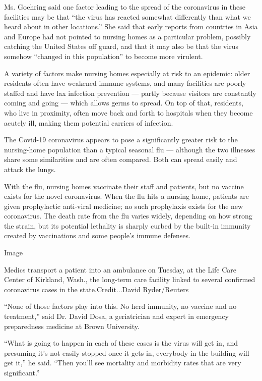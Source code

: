 Ms. Goehring said one factor leading to the spread of the coronavirus in
these facilities may be that ``the virus has reacted somewhat
differently than what we heard about in other locations.'' She said that
early reports from countries in Asia and Europe had not pointed to
nursing homes as a particular problem, possibly catching the United
States off guard, and that it may also be that the virus somehow
``changed in this population'' to become more virulent.

A variety of factors make nursing homes especially at risk to an
epidemic: older residents often have weakened immune systems, and many
facilities are poorly staffed and have lax infection prevention ---
partly because visitors are constantly coming and going --- which allows
germs to spread. On top of that, residents, who live in proximity, often
move back and forth to hospitals when they become acutely ill, making
them potential carriers of infection.

The Covid-19 coronavirus appears to pose a significantly greater risk to
the nursing-home population than a typical seasonal flu --- although the
two illnesses share some similarities and are often compared. Both can
spread easily and attack the lungs.

With the flu, nursing homes vaccinate their staff and patients, but no
vaccine exists for the novel coronavirus. When the flu hits a nursing
home, patients are given prophylactic anti-viral medicine; no such
prophylaxis exists for the new coronavirus. The death rate from the flu
varies widely, depending on how strong the strain, but its potential
lethality is sharply curbed by the built-in immunity created by
vaccinations and some people's immune defenses.

Image

Medics transport a patient into an ambulance on Tuesday, at the Life
Care Center of Kirkland, Wash., the long-term care facility linked to
several confirmed coronavirus cases in the state.Credit...David
Ryder/Reuters

``None of those factors play into this. No herd immunity, no vaccine and
no treatment,'' said Dr. David Dosa, a geriatrician and expert in
emergency preparedness medicine at Brown University.

``What is going to happen in each of these cases is the virus will get
in, and presuming it's not easily stopped once it gets in, everybody in
the building will get it,'' he said. ``Then you'll see mortality and
morbidity rates that are very significant.''

